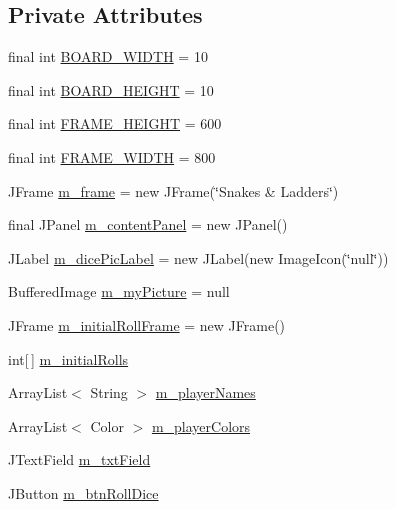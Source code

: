 \subsection*{Private Attributes}
\begin{DoxyCompactItemize}
\item 
final int \hyperlink{class_game_1_1_game_sn_l_ad8871bbe0cb946186f76093b958380b2}{B\+O\+A\+R\+D\+\_\+\+W\+I\+D\+T\+H} = 10
\item 
final int \hyperlink{class_game_1_1_game_sn_l_a1fe9384816bed631e283ad665da87b25}{B\+O\+A\+R\+D\+\_\+\+H\+E\+I\+G\+H\+T} = 10
\item 
final int \hyperlink{class_game_1_1_game_sn_l_a624c7a8a2f8d296257239b8003a5dafd}{F\+R\+A\+M\+E\+\_\+\+H\+E\+I\+G\+H\+T} = 600
\item 
final int \hyperlink{class_game_1_1_game_sn_l_afdca372266402cff76e7713cb7141ad6}{F\+R\+A\+M\+E\+\_\+\+W\+I\+D\+T\+H} = 800
\item 
J\+Frame \hyperlink{class_game_1_1_game_sn_l_a694cff89aec27b85a6b970b2304c6968}{m\+\_\+frame} = new J\+Frame(\char`\"{}Snakes \& Ladders\char`\"{})
\item 
final J\+Panel \hyperlink{class_game_1_1_game_sn_l_a073ab891cd1c2854f4dd4081cfc1319c}{m\+\_\+content\+Panel} = new J\+Panel()
\item 
J\+Label \hyperlink{class_game_1_1_game_sn_l_a59399bbb046839055516f0ce733b9ba7}{m\+\_\+dice\+Pic\+Label} = new J\+Label(new Image\+Icon(\char`\"{}null\char`\"{}))
\item 
Buffered\+Image \hyperlink{class_game_1_1_game_sn_l_af12170048b789d0c3303ab35c9b58413}{m\+\_\+my\+Picture} = null
\item 
J\+Frame \hyperlink{class_game_1_1_game_sn_l_ae665665dd40de7d795777635000da8eb}{m\+\_\+initial\+Roll\+Frame} = new J\+Frame()
\item 
int\mbox{[}$\,$\mbox{]} \hyperlink{class_game_1_1_game_sn_l_a005ffc3118d467caff14a7afdc68a520}{m\+\_\+initial\+Rolls}
\item 
Array\+List$<$ String $>$ \hyperlink{class_game_1_1_game_sn_l_a0faf146bfc9f0bd5814b3b3c71c00a20}{m\+\_\+player\+Names}
\item 
Array\+List$<$ Color $>$ \hyperlink{class_game_1_1_game_sn_l_aab5fbfe1044b0a403fdfa7634c0c344b}{m\+\_\+player\+Colors}
\item 
J\+Text\+Field \hyperlink{class_game_1_1_game_sn_l_a0726c8332d62c46e936a13dc4d3abd1b}{m\+\_\+txt\+Field}
\item 
J\+Button \hyperlink{class_game_1_1_game_sn_l_acc91a4663c2f1c4ee9381a070332d7a2}{m\+\_\+btn\+Roll\+Dice}

\end{DoxyCompactItemize}
